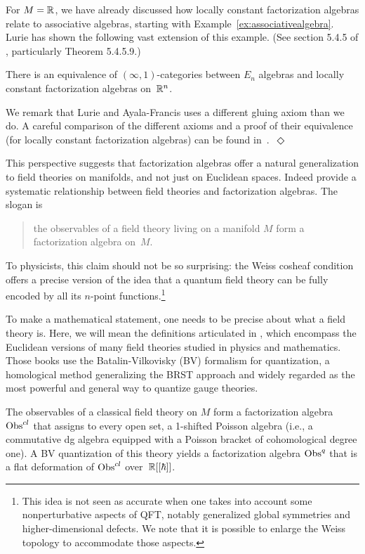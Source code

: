 \documentclass[11pt]{amsart}
\begin{document}
For $M = \mathbb R$, we have already discussed how locally constant factorization algebras relate to associative algebras, starting with Example~\ref{ex:associativealgebra}.
Lurie has shown the following vast extension of this example. (See section 5.4.5 of \cite{LurieHA}, particularly Theorem 5.4.5.9.)

\begin{thm}\label{thm:locisen}
There is an equivalence of $(\infty,1)$-categories between $E_n$ algebras and locally constant factorization algebras on~$\mathbb R^n$.  
\end{thm}  

\begin{rmk}
We remark that Lurie and Ayala-Francis uses a different gluing axiom than we do. A careful comparison of the different axioms and a proof of their equivalence (for locally constant factorization algebras) can be found in~\cite{KSW}.~\hfill $\Diamond$
\end{rmk}

This perspective suggests that factorization algebras offer a natural generalization to field theories on manifolds, and not just on Euclidean spaces. Indeed \cite{CG1, CG2} provide a systematic relationship between field theories and factorization algebras.
The slogan is 
\begin{quote}
the observables of a field theory living on a manifold $M$ form a factorization algebra on~$M$. 
\end{quote}
To physicists, this claim should not be so surprising:
the Weiss cosheaf condition offers a precise version of the idea that a quantum field theory can be fully encoded by all its $n$-point functions.\footnote{This idea is not seen as accurate when one takes into account some nonperturbative aspects of QFT, notably generalized global symmetries and higher-dimensional defects. We note that it is possible to enlarge the Weiss topology to accommodate those aspects.}

To make a mathematical statement, one needs to be precise about what a field theory is.
Here, we will mean the definitions articulated in \cite{CosBook,CG1, CG2}, which encompass the Euclidean versions of many field theories studied in physics and mathematics.
Those books use the Batalin-Vilkovisky (BV) formalism for quantization, a homological method generalizing the BRST approach and widely regarded as the most powerful and general way to quantize gauge theories. 

\begin{thm}
\label{main}
The observables of a classical field theory on $M$ form a factorization algebra ${\rm Obs}^{cl}$ that assigns to every open set, a 1-shifted Poisson algebra (i.e., a commutative dg algebra equipped with a Poisson bracket of cohomological degree one). A BV quantization of this theory yields a factorization algebra ${\rm Obs}^q$ that is a flat deformation of ${\rm Obs}^{cl}$ over~$\mathbb R[[\hbar]]$.
\end{thm}
\end{document}
